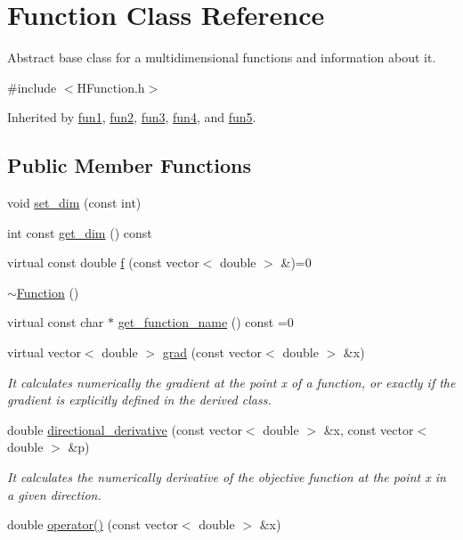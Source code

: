 \hypertarget{class_function}{}\section{Function Class Reference}
\label{class_function}


Abstract base class for a multidimensional functions and information about it.  




{\ttfamily \#include $<$H\+Function.\+h$>$}



Inherited by \hyperlink{classfun1}{fun1}, \hyperlink{classfun2}{fun2}, \hyperlink{classfun3}{fun3}, \hyperlink{classfun4}{fun4}, and \hyperlink{classfun5}{fun5}.

\subsection*{Public Member Functions}
\begin{DoxyCompactItemize}
\item 
void \hyperlink{class_function_a62de0ce683667593f68559566e35726f}{set\+\_\+dim} (const int)
\item 
int const \hyperlink{class_function_ab822c64ba8beb7fd17e8b1a38b8ff9ca}{get\+\_\+dim} () const
\item 
virtual const double \hyperlink{class_function_ae700c7cb44bd2048d712466767be2803}{f} (const vector$<$ double $>$ \&)=0
\item 
\hyperlink{class_function_a3b03f7cf0b75d16edebdda1dee1db6fd}{$\sim$\+Function} ()
\item 
virtual const char $\ast$ \hyperlink{class_function_a928c579622c47d98e91477ef18dec199}{get\+\_\+function\+\_\+name} () const =0
\item 
virtual vector$<$ double $>$ \hyperlink{class_function_a1396da5e1ee7418c76f14731128c08b4}{grad} (const vector$<$ double $>$ \&x)
\begin{DoxyCompactList}\small\item\em It calculates numerically the gradient at the point x of a function, or exactly if the gradient is explicitly defined in the derived class. \end{DoxyCompactList}\item 
double \hyperlink{class_function_a27a785d42a8cb420ee60358277188f44}{directional\+\_\+derivative} (const vector$<$ double $>$ \&x, const vector$<$ double $>$ \&p)
\begin{DoxyCompactList}\small\item\em It calculates the numerically derivative of the objective function at the point x in a given direction. \end{DoxyCompactList}\item 
double \hyperlink{class_function_ae890d237648f6320730436a66920a6e7}{operator()} (const vector$<$ double $>$ \&x)
\end{DoxyCompactItemize}

